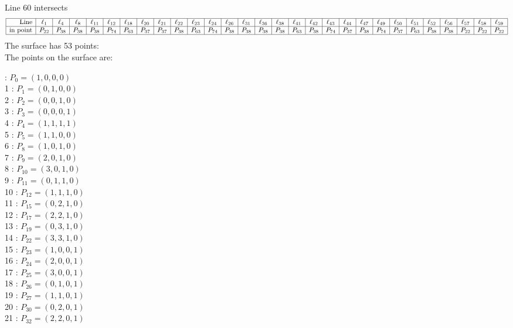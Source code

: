 \documentclass{article}
\begin{document}
{$$$$
Line 60 intersects 
$$
\begin{array}{|r*{28}{|c}|}
\hline
\mbox{Line}  & \ell_{1} & \ell_{4} & \ell_{8} & \ell_{11} & \ell_{12} & \ell_{18} & \ell_{20} & \ell_{21} & \ell_{22} & \ell_{23} & \ell_{24} & \ell_{26} & \ell_{31} & \ell_{36} & \ell_{38} & \ell_{41} & \ell_{42} & \ell_{43} & \ell_{44} & \ell_{47} & \ell_{49} & \ell_{50} & \ell_{51} & \ell_{52} & \ell_{56} & \ell_{57} & \ell_{58} & \ell_{59}\\
\hline
\mbox{in point}  & P_{22} & P_{38} & P_{38} & P_{38} & P_{74} & P_{63} & P_{37} & P_{37} & P_{38} & P_{63} & P_{74} & P_{38} & P_{38} & P_{38} & P_{38} & P_{63} & P_{38} & P_{74} & P_{37} & P_{38} & P_{74} & P_{37} & P_{63} & P_{38} & P_{38} & P_{22} & P_{22} & P_{22}\\
\hline
\end{array}
$$
The surface has 53 points:\\
The points on the surface are:\\
\begin{multicols}{3}
 : $P_{0}=( 1, 0, 0, 0 )$\\
1 : $P_{1}=( 0, 1, 0, 0 )$\\
2 : $P_{2}=( 0, 0, 1, 0 )$\\
3 : $P_{3}=( 0, 0, 0, 1 )$\\
4 : $P_{4}=( 1, 1, 1, 1 )$\\
5 : $P_{5}=( 1, 1, 0, 0 )$\\
6 : $P_{8}=( 1, 0, 1, 0 )$\\
7 : $P_{9}=( 2, 0, 1, 0 )$\\
8 : $P_{10}=( 3, 0, 1, 0 )$\\
9 : $P_{11}=( 0, 1, 1, 0 )$\\
10 : $P_{12}=( 1, 1, 1, 0 )$\\
11 : $P_{15}=( 0, 2, 1, 0 )$\\
12 : $P_{17}=( 2, 2, 1, 0 )$\\
13 : $P_{19}=( 0, 3, 1, 0 )$\\
14 : $P_{22}=( 3, 3, 1, 0 )$\\
15 : $P_{23}=( 1, 0, 0, 1 )$\\
16 : $P_{24}=( 2, 0, 0, 1 )$\\
17 : $P_{25}=( 3, 0, 0, 1 )$\\
18 : $P_{26}=( 0, 1, 0, 1 )$\\
19 : $P_{27}=( 1, 1, 0, 1 )$\\
20 : $P_{30}=( 0, 2, 0, 1 )$\\
21 : $P_{32}=( 2, 2, 0, 1 )$\\

\end{multicols}}
\end{document}

